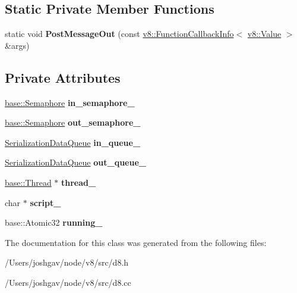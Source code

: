 \subsection*{Static Private Member Functions}
\begin{DoxyCompactItemize}
\item 
static void {\bfseries Post\+Message\+Out} (const \hyperlink{classv8_1_1_function_callback_info}{v8\+::\+Function\+Callback\+Info}$<$ \hyperlink{classv8_1_1_value}{v8\+::\+Value} $>$ \&args)\hypertarget{classv8_1_1_worker_aaca428afa266dc14dbd5037888cc9fd8}{}\label{classv8_1_1_worker_aaca428afa266dc14dbd5037888cc9fd8}

\end{DoxyCompactItemize}
\subsection*{Private Attributes}
\begin{DoxyCompactItemize}
\item 
\hyperlink{classv8_1_1base_1_1_semaphore}{base\+::\+Semaphore} {\bfseries in\+\_\+semaphore\+\_\+}\hypertarget{classv8_1_1_worker_a47e173381c549f4866c4fb83f5da7c45}{}\label{classv8_1_1_worker_a47e173381c549f4866c4fb83f5da7c45}

\item 
\hyperlink{classv8_1_1base_1_1_semaphore}{base\+::\+Semaphore} {\bfseries out\+\_\+semaphore\+\_\+}\hypertarget{classv8_1_1_worker_a44a13c1702b59c332ee287047317a81e}{}\label{classv8_1_1_worker_a44a13c1702b59c332ee287047317a81e}

\item 
\hyperlink{classv8_1_1_serialization_data_queue}{Serialization\+Data\+Queue} {\bfseries in\+\_\+queue\+\_\+}\hypertarget{classv8_1_1_worker_af419cd91ba3a107d9d4de61f92465de1}{}\label{classv8_1_1_worker_af419cd91ba3a107d9d4de61f92465de1}

\item 
\hyperlink{classv8_1_1_serialization_data_queue}{Serialization\+Data\+Queue} {\bfseries out\+\_\+queue\+\_\+}\hypertarget{classv8_1_1_worker_abff27c3a3a357a1cc380d884aba419b8}{}\label{classv8_1_1_worker_abff27c3a3a357a1cc380d884aba419b8}

\item 
\hyperlink{classv8_1_1base_1_1_thread}{base\+::\+Thread} $\ast$ {\bfseries thread\+\_\+}\hypertarget{classv8_1_1_worker_a3a9fc4f1c37b3e2f8770ec12b2701931}{}\label{classv8_1_1_worker_a3a9fc4f1c37b3e2f8770ec12b2701931}

\item 
char $\ast$ {\bfseries script\+\_\+}\hypertarget{classv8_1_1_worker_a25c144ae432f3ae26786e481c7d0a206}{}\label{classv8_1_1_worker_a25c144ae432f3ae26786e481c7d0a206}

\item 
base\+::\+Atomic32 {\bfseries running\+\_\+}\hypertarget{classv8_1_1_worker_a70b6dbcf508a917c7834715482347b90}{}\label{classv8_1_1_worker_a70b6dbcf508a917c7834715482347b90}

\end{DoxyCompactItemize}


The documentation for this class was generated from the following files\+:\begin{DoxyCompactItemize}
\item 
/\+Users/joshgav/node/v8/src/d8.\+h\item 
/\+Users/joshgav/node/v8/src/d8.\+cc\end{DoxyCompactItemize}
